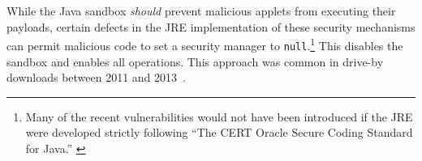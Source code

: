 \documentclass{sig-alternate-05-2015}
\begin{document}

%
While the Java sandbox \textit{should} prevent malicious applets from
executing their payloads, certain defects in the JRE implementation of these security mechanisms can permit
malicious code to set a security manager to \texttt{null}.\footnote{Many of the recent vulnerabilities
would not have been introduced if the JRE were developed strictly
following ``The CERT Oracle Secure Coding Standard for Java.'' \cite{long_cert_2011,svoboda_anatomy_blog_2013,svoboda_anatomy_2014}}  
This disables the sandbox and enables all operations. 
This approach was common in drive-by downloads between 2011 and 2013~\cite{fireeye_2013}. 
%
\end{document}
